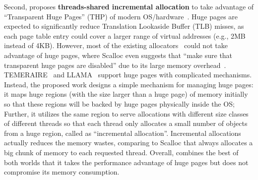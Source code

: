 
Second, \NM{} proposes \textbf{threads-shared incremental allocation} to take advantage of ``Transparent Huge Pages'' (THP) of modern OS/hardware~\cite{hugepage}. Huge pages are expected to significantly reduce Translation Lookaside Buffer (TLB) misses, as each page table entry could cover a larger range of virtual addresses (e.g., 2MB instead of 4KB). However, most of the existing allocators~\cite{dlmalloc, Hoard, tcmalloc, mimalloc} could not take advantage of huge pages, where Scalloc even suggests that ``make sure that transparent huge pages are disabled'' due to its large memory overhead~\cite{scallochugepage}. TEMERAIRE~\cite{TEMERAIRE} and LLAMA~\cite{LLAMA} support huge pages with complicated mechanisms. Instead, the proposed work designs a simple mechanism for managing huge pages: it maps huge regions (with the size larger than a huge page) of memory initially so that these regions will be backed by huge pages physically inside the OS; Further, it utilizes the same region to serve allocations with different size classes of different threads so that each thread only allocates a small number of objects from a huge region, called as ``incremental allocation''. Incremental allocations actually reduces the memory wastes, comparing to Scalloc that always allocates a big chunk of memory to each requested thread. 
Overall, \NM{} combines the best of both worlds that it takes the performance advantage of huge pages but does not compromise its memory consumption. 


